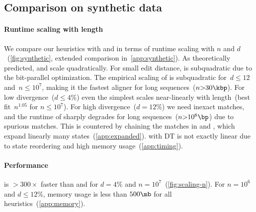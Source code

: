 \subsection{Comparison on synthetic data} \label{sec:evals-comparison-synthetic}

\paragraph{Runtime scaling with length}
We compare our \A heuristics with \edlib and \wfa in terms of runtime scaling
with $n$ and $d$~(\cref{fig:synthetic}, extended comparison in~\cref{app:synthetic}).
%
As theoretically predicted, \edlib and \wfa scale quadratically. For small edit
distance, \edlib is subquadratic due to the bit-parallel optimization. The
empirical scaling of \astarpa is subquadratic for~$d{\leq}12$ and~$n{\le}10^7$,
making it the fastest aligner for long sequences~($n{>}30\kbp$).
%
For low divergence~($d{\leq}4\%$) even the simplest \SH scales near-linearly
with length~(best fit~$n^{1.05}$ for $n{\le}10^7$).
%
For high divergence~($d{=}12\%$) we need inexact matches, and the runtime of \SH
sharply degrades for long sequences~($n{>}10^6\bp$) due to spurious matches.
This is countered by chaining the matches in \CSH and \GCH, which
expand linearly many states~(\cref{app:expanded}).
\GCH with DT is not exactly linear due to state reordering and high
memory usage~(\cref{app:timing}).

\paragraph{Performance}
\astarpa is ${>}300\times$ faster than \edlib and \wfa for $d{=}4\%$ and
$n{=}10^7$~(\cref{fig:scaling-n}). For $n{=}10^6$ and $d{\leq}
12\%$, memory usage is less than $500\mb$ for all heuristics~(\cref{app:memory}).
